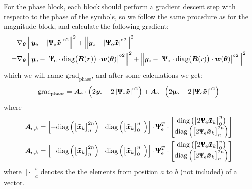 For the phase block, each block should perform a gradient descent step with respecto to the phase of the symbols, so we follow the same procedure as for the magnitude block, and calculate the following gradient:
 \begin{align}
	&\nabla_{\bm \theta}\left\lVert \bm y_\text{e} - \left|\bm{\Uppsi_\text{e}\tilde{x} } \right|^{\circ2}\right\rVert^2+\left\lVert \bm y_\text{o} - \left|\bm{\Uppsi_\text{o}\tilde{x} } \right|^{\circ2}\right\rVert^2\\
	=&\nabla_{\bm \theta}\left\lVert \bm y_\text{e} - \left|\bm{\Uppsi}_\text{e}\cdot\text{diag}\bigl(\bm R(\bm r)\bigr)\cdot\bm w(\bm \theta)  \right|^{\circ2}\right\rVert^2+\left\lVert \bm y_\text{o} - \left|\bm{\Uppsi}_\text{o}\cdot\text{diag}\bigl(\bm R(\bm r)\bigr)\cdot\bm w(\bm \theta)  \right|^{\circ2}\right\rVert^2
\end{align}
which we will name $\text{grad}_\text{phase}$, and after some calculations we get:
\begin{equation}
\text{grad}_\text{phase}=\bm A_\text{e}\cdot\left(2\bm y_\text{e} - 2\left|\bm{\Uppsi}_\text{e}\bm{\tilde{x}}\right|^{\circ2}\right)+
\bm A_\text{o}\cdot\left(2\bm y_\text{o} - 2\left|\bm{\Uppsi}_\text{o}\bm{\tilde{x}}\right|^{\circ2}\right)
\label{eq:grad_mag}
\end{equation}
where
\begin{align}
\bm A_{\text{e},k}&=\begin{bmatrix}-\text{diag}\left(\bigl[\bm{\tilde{x}}_k\bigr]_{n}^{2n}\right)&\text{diag}\left(\bigl[\bm{\tilde{x}}_k\bigr]_0^{n\phantom{1}}\right)\end{bmatrix}\cdot\bm{\Uppsi}_\text{e}^T\cdot\begin{bmatrix}\text{diag}\left(\bigl[2\bm{\Uppsi}_\text{e}\bm{\tilde{x}}_k\bigr]_0^n\right)\\\text{diag}\left(\bigl[2\bm{\Uppsi}_\text{e}\bm{\tilde{x}}_k\bigr]_{n}^{2n}\right)\end{bmatrix}\\
\bm A_{\text{e},k}&=\begin{bmatrix}-\text{diag}\left(\bigl[\bm{\tilde{x}}_k\bigr]_{n}^{2n}\right)&\text{diag}\left(\bigl[\bm{\tilde{x}}_k\bigr]_0^{n\phantom{1}}\right)\end{bmatrix}\cdot\bm{\Uppsi}_\text{e}^T\cdot\begin{bmatrix}\text{diag}\left(\bigl[2\bm{\Uppsi}_\text{e}\bm{\tilde{x}}_k\bigr]_0^n\right)\\\text{diag}\left(\bigl[2\bm{\Uppsi}_\text{e}\bm{\tilde{x}}_k\bigr]_{n}^{2n}\right)\end{bmatrix}
\end{align}
where $[\cdot]_a^b$ denotes the the elements from position $a$ to $b$ (not included) of a vector.\\

